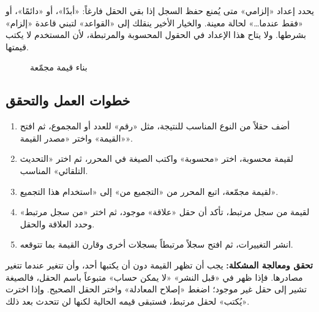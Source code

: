 يحدد إعداد «إلزامي» متى يُمنع حفظ السجل إذا بقي الحقل فارغاً: «أبدًا»، أو «دائمًا»، أو «فقط عندما…» لحالة معينة. والخيار الأخير ينقلك إلى «القواعد» لتبني قاعدة «إلزام» بشرطها. ولا يتاح هذا الإعداد في الحقول المحسوبة والمرتبطة، لأن المستخدم لا يكتب قيمتها.

\begin{figure}[H]
\centering
{}
\rclegend
\caption{بناء قيمة مجمّعة}
\label{fig:builder-field-values-flow}
\end{figure}

\subsection{خطوات العمل والتحقق}
\begin{enumerate}
\item أضف حقلاً من النوع المناسب للنتيجة، مثل «رقم» للعدد أو المجموع، ثم افتح «القيمة» واختر «مصدر القيمة».
\item لقيمة محسوبة، اختر «محسوبة» واكتب الصيغة في المحرر، ثم اختر «التحديث التلقائي» المناسب.
\item لقيمة مجمّعة، اتبع المحرر من «التجميع من» إلى «استخدام هذا التجميع».
\item لقيمة من سجل مرتبط، تأكد أن حقل «علاقة» موجود، ثم اختر «من سجل مرتبط» وحدد العلاقة والحقل.
\item انشر التغييرات، ثم افتح سجلاً مرتبطاً بسجلات أخرى وقارن القيمة بما تتوقعه.
\end{enumerate}

\textbf{تحقق ومعالجة المشكلة:} يجب أن تظهر القيمة دون أن يكتبها أحد، وأن تتغير عندما تتغير مصادرها. فإذا ظهر في «قبل النشر» «لا يمكن حساب» متبوعاً باسم الحقل، فالصيغة تشير إلى حقل غير موجود؛ اضغط «إصلاح المعادلة» واختر الحقل الصحيح. وإذا اخترت «يُكتب» لحقل مرتبط، فستبقى قيمه الحالية لكنها لن تتحدث بعد ذلك.

